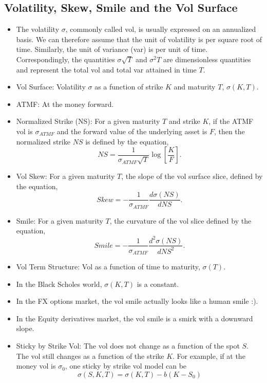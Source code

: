 \documentclass{amsart}
\theoremstyle{plain}
\numberwithin{equation}{section}
\begin{document}
\subsection{Volatility, Skew, Smile and the Vol Surface}
\begin{itemize}
	\item The volatility $\sigma$, commonly called vol, is usually expressed 
	on an annualized basis. We can therefore assume that the unit of
	volatility is per square root of time. Similarly, the unit of 
	variance (var) is per unit of time. Correspondingly, 
	the quantities $\sigma \sqrt{T}$ and $\sigma^2 T$ are dimensionless quantities and 
	represent the total vol and total var attained in time $T$.
	
	\item Vol Surface: Volatility $\sigma$ as a function of strike
	$K$ and maturity $T$, $\sigma(K, T)$.
	\item ATMF: At the money forward.
	\item Normalized Strike (NS): For a given maturity $T$ and strike $K$, if the 
	ATMF vol is $\sigma_{ATMF}$ and the forward value of the underlying asset 
	is $F$, then the normalized strike $NS$ is defined by the equation,
		$$NS = \frac{1}{\sigma_{ATMF} \sqrt{T}}\log\left[ \frac{K}{F}\right].$$
	\item Vol Skew: For a given maturity $T$, the slope of the vol surface
	slice, defined by the equation, $$Skew = -\frac{1}{\sigma_{ATMF}} \frac{d \sigma(NS)}{dNS}.$$
	\item Smile: For a given maturity $T$, the curvature of the vol slice defined
	by the equation,
	$$Smile = -\frac{1}{\sigma_{ATMF}} \frac{d^2\sigma(NS)}{dNS^2}.$$
	\item Vol Term Structure: Vol as a function of time to maturity, $\sigma(T)$.
	\item In the Black Scholes world, $\sigma(K,T)$ is a constant.
	\item In the FX options market, the vol smile actually looks like a human smile :).
	\item In the Equity derivatives market, the vol smile is a smirk with a downward slope. 
	\item Sticky by Strike Vol: The vol does not change as a function of the spot $S$. The vol
	still changes as a function of the strike $K$. For example, if at the money vol is 
	$\sigma_0$, one sticky by strike vol model can be 
	\begin{equation}
		[TODO] \sigma(S, K, T) = \sigma(K, T) - b ( K - S_0 )	
	\end{equation}
\end{itemize}
\end{document}

